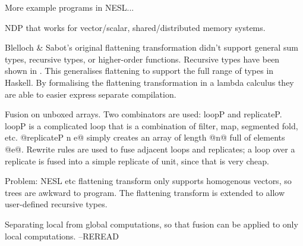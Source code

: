 More example programs in NESL...


NDP that works for vector/scalar, shared/distributed memory systems.

Blelloch \& Sabot's original flattening transformation didn't support general sum types, recursive types, or higher-order functions. Recursive types have been shown in \cite{keller1998flattening}.
This generalises flattening to support the full range of types in Haskell.
By formalising the flattening transformation in a lambda calculus they are able to easier express separate compilation.

Fusion on unboxed arrays. Two combinators are used: loopP and replicateP.
loopP is a complicated loop that is a combination of filter, map, segmented fold, etc.
@replicateP n e@ simply creates an array of length @n@ full of elements @e@.
Rewrite rules are used to fuse adjacent loops and replicates; a loop over a replicate is
fused into a simple replicate of unit, since that is very cheap.




Problem: NESL etc flattening transform only supports homogenous vectors, so trees are awkward to program.
The flattening transform is extended to allow user-defined recursive types.

Separating local from global computations, so that fusion can be applied to only local computations.
--REREAD





